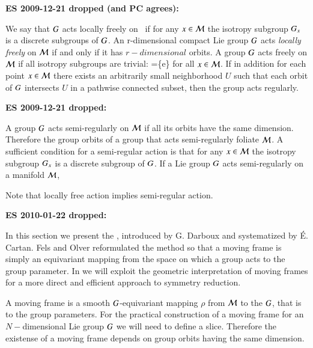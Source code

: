  {\bf ES 2009-12-21 dropped (and PC agrees):}

We say that $G$ acts locally freely on \pS\ if for any
$x\in{\cal M}$ the isotropy subgroup $G_{x}$ is a
discrete subgroups of $G$. An r-dimensional compact Lie
group $G$ acts \emph{locally freely} on ${\cal M}$ if and
only if it has $r-dimensional$ orbits. A
group $G$ acts freely on ${\cal M}$ if all isotropy subgroups
are trivial: \stab{\ssp}=\{e\} for all $x\in \mathcal{M}$. If
in addition for each point $x\in \mathcal{M}$ there exists an
arbitrarily small neighborhood $U$ such that each orbit of
$G$ intersects $U$ in a pathwise connected subset, then
the group acts regularly.

{\bf ES 2009-12-21 dropped:}

A group $G$ acts semi-regularly on ${\cal M}$ if all its
orbits have the same dimension. Therefore the group orbits of
a group that acts semi-regularly foliate ${\cal M}$. A sufficient
condition for a semi-regular action is that for any
$x\in{\cal M}$ the isotropy subgroup $G_{x}$ is a
discrete subgroup of $G$. If a Lie group $G$ acts
semi-regularly on a manifold $\mathcal{M}$,

Note that locally free action implies semi-regular action.

{\bf ES 2010-01-22 dropped:}

In this section we present the {\mframes}, introduced by G. Darboux and
systematized by \'E. Cartan.
Fels and Olver reformulated the method so that a
moving frame is simply an equivariant mapping from the space on which a
group acts to the group parameter.  In  we will
exploit the geometric interpretation of moving frames for a more direct and
efficient approach to symmetry reduction. 

A moving frame is a smooth
$G$-equivariant mapping $\rho$ from $\mathcal{M}$ to the
$G$, that is to the group parameters.  For the practical
construction of a moving frame for an $N-$dimensional Lie group
$G$ we will need to define a slice.
Therefore the existense of a moving frame depends on
group orbits having the same dimension.

